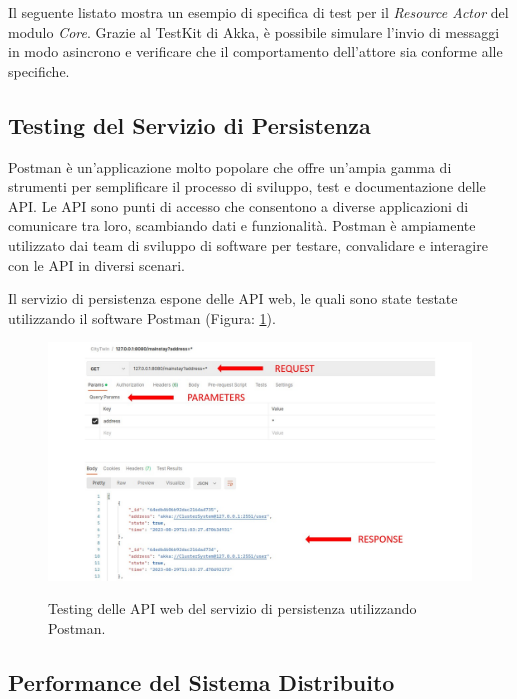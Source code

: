 \documentclass[12pt]{article}
\begin{document}
Il seguente listato mostra un esempio di specifica di test per il \textit{Resource Actor} del modulo \textit{Core}. Grazie al TestKit di Akka, è possibile simulare l'invio di messaggi in modo asincrono e verificare che il comportamento dell'attore sia conforme alle specifiche.



\subsection{Testing del Servizio di Persistenza}

Postman è un'applicazione molto popolare che offre un'ampia gamma di strumenti per semplificare il processo di sviluppo, test e documentazione delle API. Le API sono punti di accesso che consentono a diverse applicazioni di comunicare tra loro, scambiando dati e funzionalità. Postman è ampiamente utilizzato dai team di sviluppo di software per testare, convalidare e interagire con le API in diversi scenari.

Il servizio di persistenza espone delle API web, le quali sono state testate utilizzando il software Postman (Figura: \ref{fig:postman}).

\begin{figure}[H]
    \caption{Testing delle API web del servizio di persistenza utilizzando Postman.}
    \includegraphics[width=\textwidth]{../assets/images/postman.jpg}
    \label{fig:postman}
\end{figure}

\subsection{Performance del Sistema Distribuito}
\end{document}
